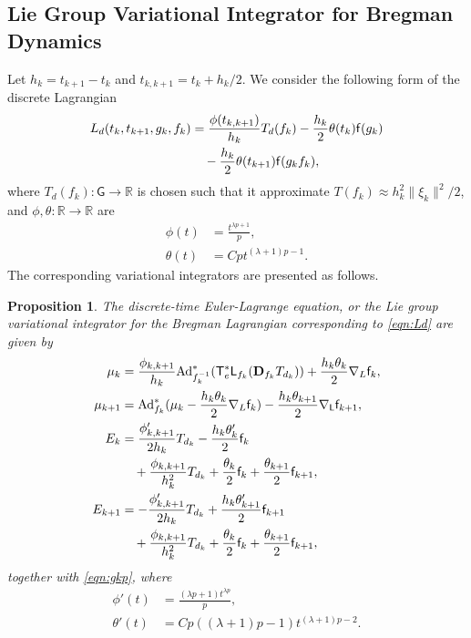 \documentclass[letterpaper, 10pt, conference]{ieeeconf}
\newcommand{\G}{\ensuremath{\mathsf{G}}}
\newcommand{\T}{\ensuremath{\mathsf{T}}}
\renewcommand{\L}{\ensuremath{\mathsf{L}}}
\renewcommand{\Re}{\ensuremath{\mathbb{R}}}
\newcommand{\D}{\ensuremath{\mathbf{D}}}
\newcommand{\Ad}{\ensuremath{\mathrm{Ad}}}
\newtheorem{prop}{Proposition}
\begin{document}
\subsection{Lie Group Variational Integrator for Bregman Dynamics}

Let $h_k = t_{k+1}- t_k$ and $t_{k,k+1} = t_k + h_k/2$.  
We consider the following form of the discrete Lagrangian
\begin{align}
    L_d(t_k, t_{k+1}, g_k, f_k ) & = \frac{\phi(t_{k,k+1}) }{h_k} T_d(f_k) -\frac{h_k}{2} \theta(t_k) \mathsf{f} (g_k)\nonumber \\
                                 & \quad -\frac{h_k}{2} \theta(t_{k+1}) \mathsf{f} (g_kf_k), \label{eqn:Ld}
\end{align}
where $T_d(f_k):\G\rightarrow\Re$ is chosen such that it approximate $T(f_k) \approx h_k^2 \|\xi_k \|^2/2$, and $\phi,\theta:\Re\rightarrow\Re$ are 
\begin{align}
    \phi(t) & = \frac{t^{\lambda p +1}}{p},\\
    \theta(t) & = C p t^{(\lambda+1)p-1}.
\end{align}
The corresponding variational integrators are presented as follows. 
\begin{prop}\label{prop:DEL_Breg}
    The discrete-time Euler-Lagrange equation, or the Lie group variational integrator for the Bregman Lagrangian corresponding to \eqref{eqn:Ld} are given by
\begin{align}
    \mu_k & =  \frac{\phi_{k,k+1}}{h_k}\Ad^*_{f_k^{-1}} (\T^*_e\L_{f_k}(\D_{f_k} T_{d_k})) + \frac{h_k\theta_k}{2} \nabla_L \obj_k, \label{eqn:muk_Breg}\\
    \mu_{k+1} & = \Ad^*_{f_k}( \mu_k - \frac{h_k\theta_k}{2} \nabla_L\obj_k ) -\frac{h_k\theta_{k+1}}{2} \nabla_\L \obj_{k+1}, \label{eqn:mukp_Breg}\\
    E_{k} & = \frac{\phi'_{k,k+1}}{ 2 h_k} T_{d_k} -\frac{h_k\theta'_{k}}{2} \obj_{k} \nonumber\\\
          & \quad + \frac{\phi_{k,k+1}}{h_k^2}T_{d_k} + \frac{\theta_k}{2}\obj_k + \frac{\theta_{k+1}}{2}\obj_{k+1}, \label{eqn:Ek_Breg}\\
    E_{k+1} & = -\frac{\phi'_{k,k+1}}{ 2 h_k} T_{d_k} +\frac{h_k\theta'_{k+1}}{2} \obj_{k+1}\nonumber \\\
            & \quad + \frac{\phi_{k,k+1}}{h_k^2}T_{d_k} +\frac{\theta_k}{2}\obj_k + \frac{\theta_{k+1}}{2}\obj_{k+1}, \label{eqn:Ekp_Breg}
\end{align}
together with \eqref{eqn:gkp}, where
\begin{align*}
    \phi'(t) & = \frac{(\lambda p +1) t^{\lambda p}}{p}, \\
    \theta'(t) &  = Cp((\lambda+1)p-1) t^{(\lambda +1)p-2}.
\end{align*}
\end{prop}
\end{document}
